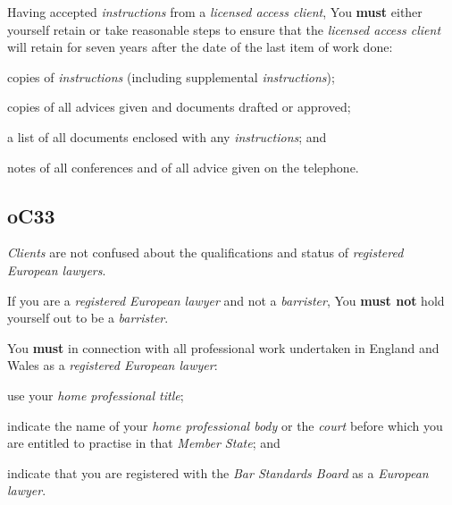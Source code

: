 Having accepted \emph{instructions} from a \emph{licensed access
client}, You \textcolor{myred}{\textbf{must}} either yourself retain or take reasonable steps to
ensure that the \emph{licensed access client} will retain for seven
years after the date of the last item of work done:
\begin{numlist}\item copies of \emph{instructions} (including supplemental
\emph{instructions});
\item copies of all advices given and documents drafted or approved;
\item a list of all documents enclosed with any \emph{instructions}; and
\item notes of all conferences and of all advice given on the telephone.
\end{numlist}






\subsection{\color{bleu}oC33}

\emph{Clients} are not confused about the qualifications and status of
\emph{registered European lawyers}.




If you are a \emph{registered European lawyer} and not a
\emph{barrister}, You \textcolor{myred}{\textbf{must not}} hold yourself out to be a
\emph{barrister}.


You \textcolor{myred}{\textbf{must}} in connection with all professional work undertaken in England
and Wales as a \emph{registered European lawyer}:
\begin{numlist}\item use your \emph{home professional title};
\item indicate the name of your \emph{home professional body} or the
\emph{court} before which you are entitled to practise in that
\emph{Member State}; and
\item indicate that you are registered with the \emph{Bar Standards Board}
as a \emph{European lawyer}.
\end{numlist}



